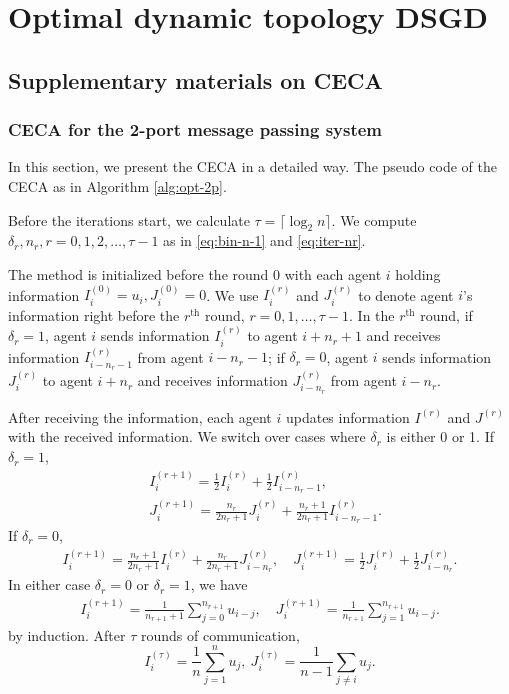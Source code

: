 \documentclass{article}
\newcommand{\ro}{{(r)}}
\theoremstyle{plain}
\theoremstyle{definition}
\begin{document}
\section{Optimal dynamic topology DSGD}
\subsection{Supplementary materials on CECA}
\label{append:CECA-allreduce-supp}
\subsubsection{CECA for the 2-port message passing system}
\label{append:CECA-2-port}
In this section, we present the CECA in a detailed way. The pseudo code of the CECA as in Algorithm \ref{alg:opt-2p}.

Before the iterations start, we calculate $\tau=\lceil \log_2 n\rceil$. We compute $\delta_r, n_r, r=0,1,2,\ldots,\tau-1$ as in \eqref{eq:bin-n-1} and \eqref{eq:iter-nr}.

The method is initialized before the round 0 with each agent $i$ holding information $I^{(0)}_i=u_i, J^{(0)}_i=0$. We use $I^\ro_i$ and $J^\ro_i$ to denote agent $i$'s information right before the $r^{\text{th}}$ round, $r=0,1,\ldots,\tau-1$. In the $r^{\text{th}}$ round, if $\delta_r=1$, agent $i$ sends information $I^\ro_i$ to agent $i+n_r+1$ and receives information $I^\ro_{i-n_r-1}$ from agent $i-n_r-1$; if $\delta_r=0$, agent $i$ sends information $J^\ro_i$ to agent $i+n_r$ and receives information $J^\ro_{i-n_r}$ from agent $i-n_r$.

After receiving the information, each agent $i$ updates information $I^\ro$ and $J^\ro$ with the received information. {We switch over cases where $\delta_r$ is either 0 or 1.} If $\delta_r=1$,
\begin{align*}
&I^{(r+1)}_i=\frac{1}{2}I^\ro_i+\frac{1}{2}I^\ro_{i-n_r-1},\\ 
&J^{(r+1)}_i=\frac{n_r}{2n_r+1}J^\ro_i+\frac{n_r+1}{2n_r+1}I^\ro_{i-n_r-1}.
\end{align*}
If $\delta_r=0$,
\begin{align*}
I^{(r+1)}_i=\frac{n_r+1}{2n_r+1}I^\ro_i+\frac{n_r}{2n_r+1}J^\ro_{i-n_r},\quad J^{(r+1)}_i=\frac{1}{2}J^\ro_i+\frac{1}{2}J^\ro_{i-n_r}.
\end{align*}
In either case $\delta_r=0$ or $\delta_r=1$, we have 
\begin{align*}
I^{(r+1)}_i=\frac{1}{n_{r+1}+1}\sum_{j=0}^{n_{r+1}}u_{i-j},\quad
J^{(r+1)}_i=\frac{1}{n_{r+1}}\sum_{j=1}^{n_{r+1}}u_{i-j}.
\end{align*}
by induction. After $\tau$ rounds of communication, 
$$
I^{(\tau)}_i=\frac{1}{n}\sum_{j=1}^n u_j,~ J^{(\tau)}_i=\frac{1}{n-1}\sum_{j\neq i} u_j.
$$
\end{document}
